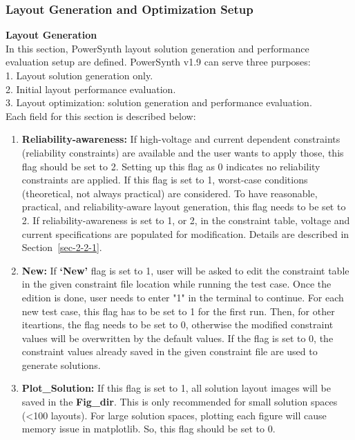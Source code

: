 \documentclass[11pt]{article}
\begin{document}
\subsubsection{Layout Generation and Optimization Setup}
\label{sec-2-3-2}
\textbf{Layout Generation}\\
In this section, PowerSynth layout solution generation and performance evaluation setup are defined. PowerSynth v1.9 can serve three purposes:\\
1. Layout solution generation only.\\
2. Initial layout performance evaluation.\\
3. Layout optimization: solution generation and performance evaluation.\\
Each field for this section is described below:
\begin{enumerate}
    \item \textbf{Reliability-awareness:}
    If high-voltage and current dependent constraints (reliability constraints) are available and the user wants to apply those, this flag should be set to 2. Setting up this flag as 0 indicates no reliability constraints are applied. If this flag is set to 1, worst-case conditions (theoretical, not always practical) are considered. To have reasonable, practical, and reliability-aware layout generation, this flag needs to be set to 2. If reliability-awareness is set to 1, or 2, in the constraint table, voltage and current specifications are populated for modification. Details are described in Section~\ref{sec-2-2-1}. 
    
    \item \textbf{New:}
    If \textbf{`New'} flag is set to 1, user will be asked to edit the constraint table in the given constraint file location while running the test case. Once the edition is done, user needs to enter "1" in the terminal to continue. For each new test case, this flag has to be set to 1 for the first run. Then, for other iteartions, the flag needs to be set to 0, otherwise the modified constraint values will be overwritten by the default values. If the flag is set to 0, the constraint values already saved in the given constraint file are used to generate solutions.
	
	 \item \textbf{Plot\_Solution:}
	 If this flag is set to 1, all solution layout images will be saved in the \textbf{Fig\_dir}. This is only recommended for small solution spaces (<100 layouts). For large solution spaces, plotting each figure will cause memory issue in matplotlib. So, this flag should be set to 0.
	 

\end{enumerate}
\end{document}
